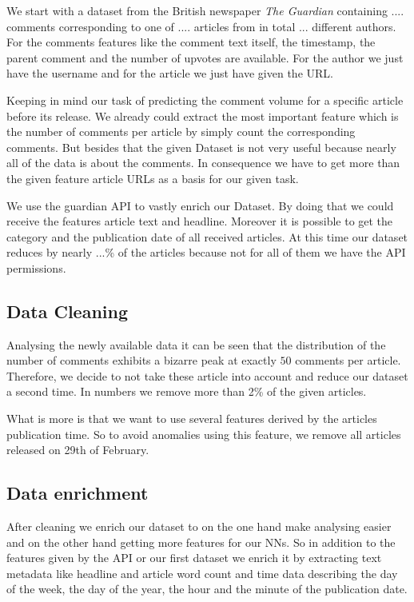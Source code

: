 We start with a dataset from the British newspaper \textit{The Guardian} containing .... comments corresponding to one of .... articles from in total ... different authors. 
For the comments features like the comment text itself, the timestamp, the parent comment and the number of upvotes are available. 
For the author we just have the username and for the article we just have given the URL. 

Keeping in mind our task of predicting the comment volume for a specific article before its release. We already could extract the most important feature which is the number of comments per article by simply count the corresponding comments. But besides that the given Dataset is not very useful because nearly all of the data is about the comments. In consequence we have to get more than the given feature article URLs as a basis for our given task.

We use the guardian API to vastly enrich our Dataset. By doing that we could receive the features article text and headline. Moreover it is possible to get the category and the publication date of all received articles. At this time our dataset reduces by nearly ...\% of the articles because not for all of them we have the API permissions.

\subsection{Data Cleaning}
Analysing the newly available data it can be seen that the distribution of the number of comments exhibits a bizarre peak at exactly $50$ comments per article. Therefore, we decide to not take these article into account and reduce our dataset a second time. In numbers we remove more than 2\% of the given articles. 

What is more is that we want to use several features derived by the articles publication time. So to avoid anomalies using this feature, we remove all articles released on 29th of February.

\subsection{Data enrichment}
After cleaning we enrich our dataset to on the one hand make analysing easier and on the other hand getting more features for our NNs.
So in addition to the features given by the API or our first dataset we enrich it by extracting text metadata like headline and article word count and time data describing the day of the week, the day of the year, the hour and the minute of the publication date.


